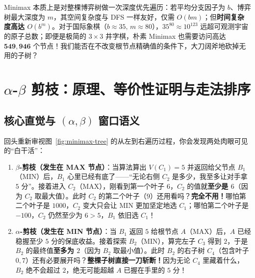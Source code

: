 Minimax 本质上是对整棵博弈树做一次深度优先遍历：若平均分支因子为 $b$、博弈树最大深度为 $m$，其空间复杂度与 DFS 一样友好，仅需 $O(bm)$；但\textbf{时间复杂度高达 $O(b^m)$}。对于国际象棋（$b\approx 35,\, m\approx 80$），$35^{80} \approx 10^{123}$ 远超可观测宇宙的原子总数；即便是极简的 $3\times 3$ 井字棋，朴素 Minimax 也需要访问高达 $\mathbf{549{,}946}$ 个节点！我们能否在不改变根节点精确值的条件下，大刀阔斧地砍掉无用的子树？

\section{\texorpdfstring{$\alpha$-$\beta$}{α-β} 剪枝：原理、等价性证明与走法排序}\label{sec:alphabeta}

\subsection{核心直觉与 $(\alpha, \beta)$ 窗口语义}

回头重新审视图~\ref{fig:minimax-tree} 的从左到右遍历过程，你会发现两处肉眼可见的“白干活”：
\begin{enumerate}
  \item \textbf{$\beta$-剪枝（发生在 MAX 节点）}：当算法算出 $V(C_1)=5$ 并返回给父节点 $B_1$（MIN）后，$B_1$ 心里已经有底了——“无论右侧 $C_2$ 是多少，我至多让对手拿 $5$ 分”。接着进入 $C_2$（MAX），刚看到第一个叶子 $6$，$C_2$ 的值就\textbf{至少是 $6$}（因为 $C_2$ 取最大值）。此时 $C_2$ 的第二个叶子（$9$）还用看吗？\textbf{完全不用！}哪怕第二个叶子是 $1000$，$C_2$ 变大只会让 \textsf{MIN} 更加坚定地选 $C_1$；哪怕第二个叶子是 $-100$，$C_2$ 仍然至少为 $6 > 5$，$B_1$ 依旧选 $C_1$！
  \item \textbf{$\alpha$-剪枝（发生在 MIN 节点）}：当 $B_1$ 返回 $5$ 给根节点 $A$（MAX）后，$A$ 已经稳握至少 $5$ 分的保底收益。接着探索 $B_2$（MIN），算完左子 $C_3$ 得到 $2$，于是 $B_2$ 的最终值\textbf{至多为 $2$}（因为 $B_2$ 取最小值）。此时 $B_2$ 的右子树 $C_4$（包含叶子 $0, 7$）还有必要展开吗？\textbf{整棵子树直接一刀斩断！}因为无论 $C_4$ 里藏着什么，$B_2$ 绝不会超过 $2$，绝无可能超越 $A$ 已握在手里的 $5$ 分！
\end{enumerate}

